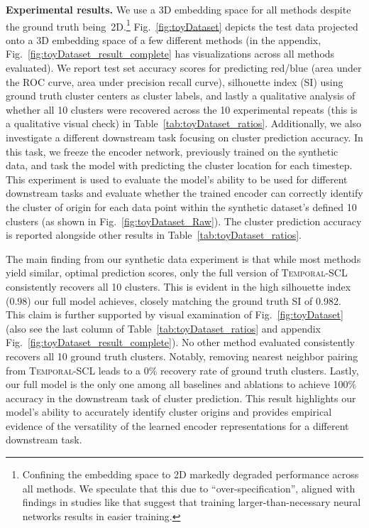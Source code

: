 \documentclass[pmlr,twocolumn,10pt]{jmlr} %
\begin{document}
\vspace{.2em}
\noindent
\textbf{Experimental results.}
We use a 3D embedding space for all methods despite the ground truth being~2D.\footnote{Confining the embedding space to 2D markedly degraded performance across all methods. We speculate that this due to ``over-specification'', aligned with findings in studies like \citet{livni2014computational} that suggest that training larger-than-necessary neural networks results in easier training.}
Fig.~\ref{fig:toyDataset} depicts the test data projected onto a 3D embedding space of a few different methods (in the appendix, Fig.~\ref{fig:toyDataset_result_complete} has visualizations across all methods evaluated). 
We report test set accuracy scores for predicting red/blue (area under the ROC curve, area under precision recall curve), silhouette index (SI) using ground truth cluster centers as cluster labels, and lastly a qualitative analysis of whether all 10 clusters were recovered across the 10 experimental repeats (this is a qualitative visual check) in Table~\ref{tab:toyDataset_ratios}. 
Additionally, we also investigate a different downstream task focusing on cluster prediction accuracy. In this task, we freeze the encoder network, previously trained on the synthetic data, and task the model with predicting the cluster location for each timestep. This experiment is used to evaluate the model's ability to be used for different downstream tasks and evaluate whether the trained encoder can correctly identify the cluster of origin for each data point within the synthetic dataset's defined 10 clusters (as shown in Fig.~\ref{fig:toyDataset_Raw}). The cluster prediction accuracy is reported alongside other results in Table~\ref{tab:toyDataset_ratios}.

The main finding from our synthetic data experiment is that while most methods yield similar, optimal prediction scores, only the full version of \textsc{Temporal-SCL} consistently recovers all 10 clusters. This is evident in the high silhouette index (0.98) our full model achieves, closely matching the ground truth SI of 0.982. %
This claim is further supported by visual examination of Fig.~\ref{fig:toyDataset} (also see the last column of Table~\ref{tab:toyDataset_ratios} and appendix Fig.~\ref{fig:toyDataset_result_complete}). No other method evaluated consistently recovers all 10 ground truth clusters. Notably, removing nearest neighbor pairing from \textsc{Temporal-SCL} leads to a 0\% recovery rate of ground truth clusters. 
Lastly, our full model is the only one among all baselines and ablations to achieve 100\% accuracy in the downstream task of cluster prediction. This result highlights our model's ability to accurately identify cluster origins and provides empirical evidence of the versatility of the learned encoder representations for a different downstream task.
\end{document}
